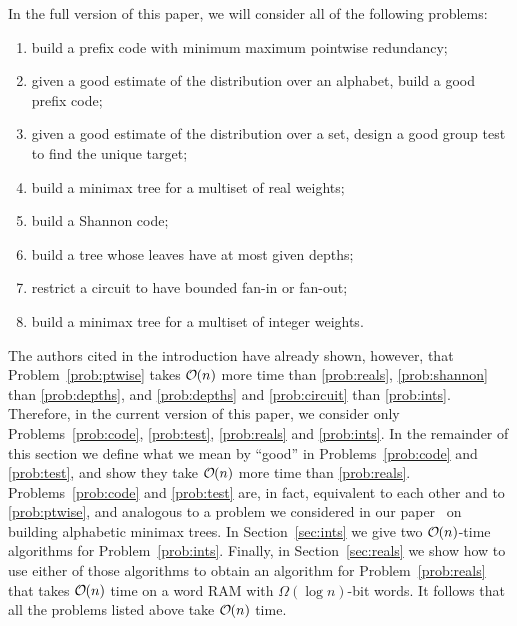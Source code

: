 \documentclass[runningheads]{llncs}
\newcommand{\Oh}[1]
    {\ensuremath{\mathcal{O} \hspace{-.5ex} \left( {#1} \right)}}
\begin{document}
In the full version of this paper, we will consider all of the following problems:
\begin{enumerate}
\renewcommand{\theenumi}{\Alph{enumi}}
\item \label{prob:ptwise}
    build a prefix code with minimum maximum pointwise redundancy;
\item \label{prob:code}
    given a good estimate of the distribution over an alphabet, build a good prefix code;
\item \label{prob:test}
    given a good estimate of the distribution over a set, design a good group test to find the unique target;
\item \label{prob:reals}
    build a minimax tree for a multiset of real weights;
\item \label{prob:shannon}
    build a Shannon code;
\item \label{prob:depths}
    build a tree whose leaves have at most given depths;
\item \label{prob:circuit}
    restrict a circuit to have bounded fan-in or fan-out;
\item \label{prob:ints}
    build a minimax tree for a multiset of integer weights.
\end{enumerate}
The authors cited in the introduction have already shown, however, that Problem~\ref{prob:ptwise} takes $\Oh{n}$ more time than \ref{prob:reals}, \ref{prob:shannon} than \ref{prob:depths}, and \ref{prob:depths} and \ref{prob:circuit} than \ref{prob:ints}.  Therefore, in the current version of this paper, we consider only Problems~\ref{prob:code}, \ref{prob:test}, \ref{prob:reals} and \ref{prob:ints}.  In the remainder of this section we define what we mean by ``good'' in Problems~\ref{prob:code} and \ref{prob:test}, and show they take $\Oh{n}$ more time than \ref{prob:reals}.  Problems~\ref{prob:code} and \ref{prob:test} are, in fact, equivalent to each other and to \ref{prob:ptwise}, and analogous to a problem we considered in our paper~\cite{Gag??} on building alphabetic minimax trees.  In Section~\ref{sec:ints} we give two $\Oh{n}$-time algorithms for Problem~\ref{prob:ints}.  Finally, in Section~\ref{sec:reals} we show how to use either of those algorithms to obtain an algorithm for Problem~\ref{prob:reals} that takes $\Oh{n}$ time on a word RAM with \(\Omega (\log n)\)-bit words.  It follows that all the problems listed above take $\Oh{n}$ time.
\end{document}

